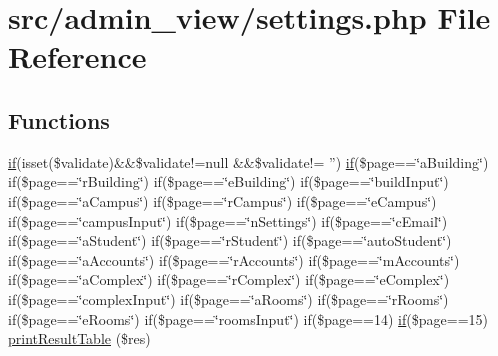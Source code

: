 \hypertarget{settings_8php}{\section{src/admin\-\_\-view/settings.php \-File \-Reference}
\label{settings_8php}
}
\subsection*{\-Functions}
\begin{DoxyCompactItemize}
\item 
\hyperlink{updateBenchDB_8php_a0c1f2915e12defa9f4d515347d884dee}{if}(isset(\$validate)\&\&\$validate!=null \*
\&\&\$validate!= '') \hyperlink{updateBenchDB_8php_a0c1f2915e12defa9f4d515347d884dee}{if}(\$page==\char`\"{}a\-Building\char`\"{}) \*
if(\$page==\char`\"{}r\-Building\char`\"{}) if(\$page==\char`\"{}e\-Building\char`\"{}) \*
if(\$page==\char`\"{}build\-Input\char`\"{}) if(\$page==\char`\"{}a\-Campus\char`\"{}) \*
if(\$page==\char`\"{}r\-Campus\char`\"{}) if(\$page==\char`\"{}e\-Campus\char`\"{}) \*
if(\$page==\char`\"{}campus\-Input\char`\"{}) if(\$page==\char`\"{}n\-Settings\char`\"{}) \*
if(\$page==\char`\"{}c\-Email\char`\"{}) if(\$page==\char`\"{}a\-Student\char`\"{}) \*
if(\$page==\char`\"{}r\-Student\char`\"{}) if(\$page==\char`\"{}auto\-Student\char`\"{}) \*
if(\$page==\char`\"{}a\-Accounts\char`\"{}) if(\$page==\char`\"{}r\-Accounts\char`\"{}) \*
if(\$page==\char`\"{}m\-Accounts\char`\"{}) if(\$page==\char`\"{}a\-Complex\char`\"{}) \*
if(\$page==\char`\"{}r\-Complex\char`\"{}) if(\$page==\char`\"{}e\-Complex\char`\"{}) \*
if(\$page==\char`\"{}complex\-Input\char`\"{}) if(\$page==\char`\"{}a\-Rooms\char`\"{}) \*
if(\$page==\char`\"{}r\-Rooms\char`\"{}) if(\$page==\char`\"{}e\-Rooms\char`\"{}) \*
if(\$page==\char`\"{}rooms\-Input\char`\"{}) if(\$page==14) \*
\hyperlink{updateBenchDB_8php_a0c1f2915e12defa9f4d515347d884dee}{if}(\$page==15) \hyperlink{settings_8php_a3fe408882ee0f65b33c57642d9b6d505}{print\-Result\-Table} (\$res)
\end{DoxyCompactItemize}
